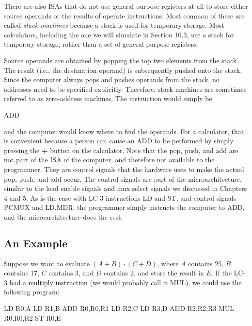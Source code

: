 \documentclass{patt}
\begin{document}
There are also ISAs that do not use general purpose registers at all to store 
either source operands or the results of operate instructions.  Most common 
of these are called {\em stack machines} because a stack is used for temporary 
storage.  Most calculators, including the one we will simulate in Section 10.3,
use a stack for temporary storage, rather than a set of general purpose 
registers.  

Source operands are obtained by popping the top two elements from the stack.
The result (i.e., the destination operand) is subsequently pushed onto the 
stack.  Since the computer always pops and pushes operands from the stack, 
no addresses need to be specified explicitly.  Therefore, stack machines are 
sometimes referred to as zero-address machines.  The instruction would simply be

\begin{colorverbatim}
                              ADD
\end{colorverbatim}

\noindent 
and the computer would know where to find the operands.  For a calculator, 
that is convenient because a person can cause an ADD to be performed by simply 
pressing the {\bf +} button on the calculator.  Note that the pop, push, 
and add are not part of the ISA of the computer, and therefore not
available to the programmer. They are control signals that the
hardware uses to make the actual pop, push, and add occur. The control
signals are part of the microarchitecture, similar to the load enable
signals and mux select signals we discussed in Chapters 4 and 5.  As
is the case with LC-3 instructions LD and ST, and control signals
PCMUX and LD.MDR, the programmer simply instructs the computer to ADD,
and the microarchitecture does the rest.

\subsection{An Example}

Suppose we want to evaluate $(A+B)\cdot(C+D)$, where $A$
contains 25, $B$ contains 17, $C$ contains 3, and $D$ contains 2, and store
the result in $E$. If the LC-3 had a multiply instruction (we would
probably call it MUL), we could use the following program:

\begin{colorverbatim}
                       LD    R0,A
                       LD    R1,B
                       ADD   R0,R0,R1
                       LD    R2,C
                       LD    R3,D
                       ADD   R2,R2,R3
                       MUL   R0,R0,R2
                       ST    R0,E
\end{colorverbatim}
\end{document}

